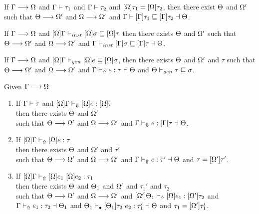 \begin{theorem}

If $\Gamma \longrightarrow \Omega$ and $\Gamma \vdash \tau_1$ and $\Gamma \vdash \tau_2$ and $[\Omega]\tau_1 = [\Omega]\tau_2$, then there exist $\Theta$ and $\Omega'$ such that $\Theta \longrightarrow \Omega'$ and $\Omega \longrightarrow \Omega'$ and $\Gamma \vdash [\Gamma]\tau_1 \sqsubseteq [\Gamma]\tau_2 \dashv \Theta$.
\end{theorem}

\begin{theorem}

If $\Gamma \longrightarrow \Omega$ and $[\Omega]\Gamma \vdash_{inst} [\Omega]\sigma \sqsubseteq [\Omega]\tau$
then there exists $\Theta$ and $\Omega'$
such that $\Theta \longrightarrow \Omega'$ and $\Omega \longrightarrow \Omega'$ and $\Gamma \vdash_{inst} [\Gamma]\sigma \sqsubseteq [\Gamma]\tau \dashv \Theta$.
\end{theorem}

\begin{theorem}

If $\Gamma \longrightarrow \Omega$ and $[\Omega] \Gamma \vdash_{gen} [\Omega]e \sqsubseteq [\Omega]\sigma$,
then there exists $\Theta$ and $\Omega'$ and $\tau$
such that $\Theta \longrightarrow \Omega'$ and $\Omega \longrightarrow \Omega'$ and $\Gamma \vdash_\Uparrow e : \tau \dashv \Theta$ and $\Theta \vdash_{gen} \tau \sqsubseteq \sigma$.
\end{theorem}

\begin{theorem}

Given $\Gamma \longrightarrow \Omega$
\begin{enumerate}
    \item If $\Gamma \vdash \tau$ and $[\Omega]\Gamma \vdash_\Downarrow [\Omega]e : [\Omega]\tau$\\
          then there exists $\Theta$ and $\Omega'$\\
          such that $\Theta \longrightarrow \Omega'$ and $\Omega \longrightarrow \Omega'$ and $\Gamma \vdash_\Downarrow e: [\Gamma]\tau \dashv \Theta$.
    \item If $[\Omega]\Gamma \vdash_\Uparrow [\Omega]e : \tau$\\
          then there exists $\Theta$ and $\Omega'$ and $\tau'$\\
          such that $\Theta \longrightarrow \Omega'$ and $\Omega \longrightarrow \Omega'$ and $\Gamma \vdash_\Uparrow e:\tau' \dashv \Theta$ and $\tau = [\Omega']\tau'$.
    \item If $[\Omega]\Gamma \vdash_\Uparrow [\Omega]e_1 ~ [\Omega]e_2 :\tau_1$\\
          then there exists $\Theta$ and $\Theta_1$ and $\Omega'$ and $\tau_1'$ and $\tau_2$\\
          such that $\Theta \longrightarrow \Omega'$ and $\Omega \longrightarrow \Omega'$ and $[\Omega']\Theta_1 \vdash_\Uparrow [\Omega]e_1 :[\Omega']\tau_2$ and $\Gamma \vdash_\Uparrow e_1 : \tau_2 \dashv \Theta_1$ and $\Theta_1 \vdash_\bullet [\Theta_1]\tau_2 ~ e_2 :\tau_1' \dashv \Theta$ and $\tau_1 = [\Omega']\tau_1'$.
\end{enumerate}
\end{theorem}

